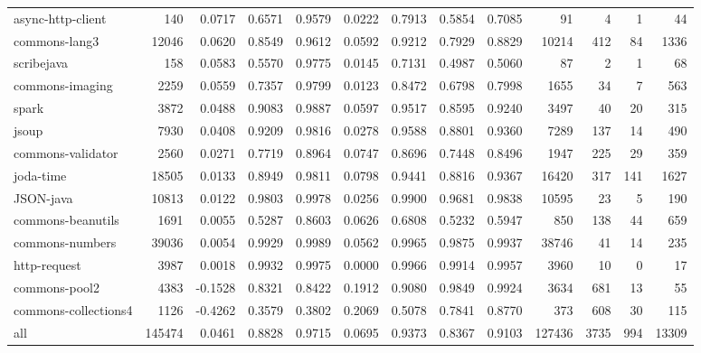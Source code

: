 \begin{table*}
\begin{tabular}{lrrrrrrrrrrrr}
      async-http-client &     140 &      0.0717 &  0.6571 &     0.9579 &     0.0222 &  0.7913 &     0.5854 &   0.7085 &      91 &     4 &    1 &     44 \\
          commons-lang3 &   12046 &      0.0620 &  0.8549 &     0.9612 &     0.0592 &  0.9212 &     0.7929 &   0.8829 &   10214 &   412 &   84 &   1336 \\
             scribejava &     158 &      0.0583 &  0.5570 &     0.9775 &     0.0145 &  0.7131 &     0.4987 &   0.5060 &      87 &     2 &    1 &     68 \\
        commons-imaging &    2259 &      0.0559 &  0.7357 &     0.9799 &     0.0123 &  0.8472 &     0.6798 &   0.7998 &    1655 &    34 &    7 &    563 \\
                  spark &    3872 &      0.0488 &  0.9083 &     0.9887 &     0.0597 &  0.9517 &     0.8595 &   0.9240 &    3497 &    40 &   20 &    315 \\
                  jsoup &    7930 &      0.0408 &  0.9209 &     0.9816 &     0.0278 &  0.9588 &     0.8801 &   0.9360 &    7289 &   137 &   14 &    490 \\
      commons-validator &    2560 &      0.0271 &  0.7719 &     0.8964 &     0.0747 &  0.8696 &     0.7448 &   0.8496 &    1947 &   225 &   29 &    359 \\
              joda-time &   18505 &      0.0133 &  0.8949 &     0.9811 &     0.0798 &  0.9441 &     0.8816 &   0.9367 &   16420 &   317 &  141 &   1627 \\
              JSON-java &   10813 &      0.0122 &  0.9803 &     0.9978 &     0.0256 &  0.9900 &     0.9681 &   0.9838 &   10595 &    23 &    5 &    190 \\
      commons-beanutils &    1691 &      0.0055 &  0.5287 &     0.8603 &     0.0626 &  0.6808 &     0.5232 &   0.5947 &     850 &   138 &   44 &    659 \\
        commons-numbers &   39036 &      0.0054 &  0.9929 &     0.9989 &     0.0562 &  0.9965 &     0.9875 &   0.9937 &   38746 &    41 &   14 &    235 \\
           http-request &    3987 &      0.0018 &  0.9932 &     0.9975 &     0.0000 &  0.9966 &     0.9914 &   0.9957 &    3960 &    10 &    0 &     17 \\
          commons-pool2 &    4383 &     -0.1528 &  0.8321 &     0.8422 &     0.1912 &  0.9080 &     0.9849 &   0.9924 &    3634 &   681 &   13 &     55 \\
   commons-collections4 &    1126 &     -0.4262 &  0.3579 &     0.3802 &     0.2069 &  0.5078 &     0.7841 &   0.8770 &     373 &   608 &   30 &    115 \\
                    all &  145474 &      0.0461 &  0.8828 &     0.9715 &     0.0695 &  0.9373 &     0.8367 &   0.9103 &  127436 &  3735 &  994 &  13309 \\
\bottomrule
\end{tabular}
\end{table*}
